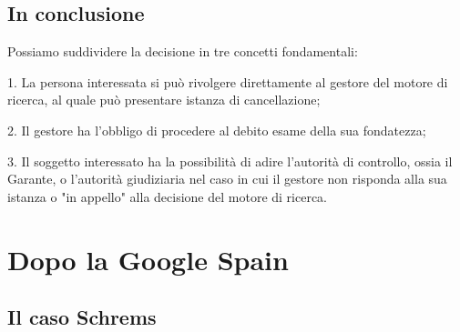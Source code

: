 \subsection{In conclusione}
Possiamo suddividere la decisione in tre concetti fondamentali:

1. La persona interessata si può rivolgere direttamente al gestore del motore di ricerca, al quale può presentare istanza di cancellazione;

2. Il gestore ha l'obbligo di procedere al debito esame della sua fondatezza;

3. Il soggetto interessato ha la possibilità di adire l'autorità di controllo, ossia il Garante, o l'autorità giudiziaria nel caso in cui il gestore non risponda alla sua istanza o "in appello" alla decisione del motore di ricerca.
\section{Dopo la Google Spain}
\subsection{Il caso Schrems}

